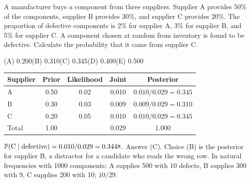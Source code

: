\begin{example}
A manufacturer buys a component from three suppliers. Supplier A provides 50\% of the
components, supplier B provides 30\%, and supplier C provides 20\%. The proportion of
defective components is 2\% for supplier A, 3\% for supplier B, and 5\% for supplier C. A
component chosen at random from inventory is found to be defective. Calculate the probability
that it came from supplier C.
\par\smallskip\noindent (A) 0.200\qquad (B) 0.310\qquad (C) 0.345\qquad (D) 0.400\qquad (E) 0.500
\end{example}
\begin{solution}
\begin{center}
\begin{tabular}{@{}lcccc@{}}
\toprule
Supplier & Prior & Likelihood & Joint & Posterior \\
\midrule
A & 0.50 & 0.02 & 0.010 & $0.010/0.029 = 0.345$ \\
B & 0.30 & 0.03 & 0.009 & $0.009/0.029 = 0.310$ \\
C & 0.20 & 0.05 & 0.010 & $0.010/0.029 = 0.345$ \\
\midrule
Total & 1.00 & & 0.029 & 1.000 \\
\bottomrule
\end{tabular}
\end{center}
$\mathbb{P}(\text{C} \mid \text{defective}) = 0.010/0.029 = 0.3448$. Answer (C). Choice (B) is the
posterior for supplier B, a distractor for a candidate who reads the wrong row. In natural
frequencies with 1000 components: A supplies 500 with 10 defects, B supplies 300 with 9,
C supplies 200 with 10; $10/29$.
\end{solution}

